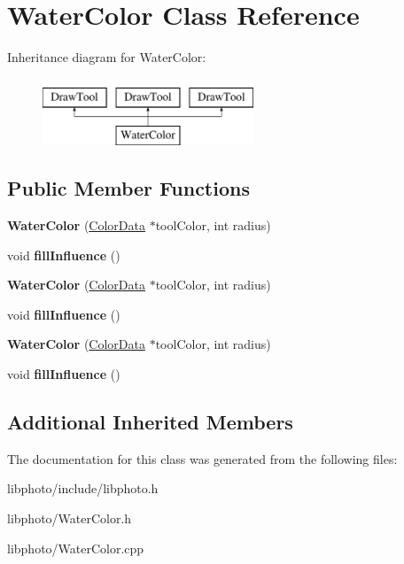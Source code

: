 \hypertarget{classWaterColor}{\section{Water\-Color Class Reference}
\label{classWaterColor}
}
Inheritance diagram for Water\-Color\-:\begin{figure}[H]
\begin{center}
\leavevmode
\includegraphics[height=2.000000cm]{classWaterColor}
\end{center}
\end{figure}
\subsection*{Public Member Functions}
\begin{DoxyCompactItemize}
\item 
\hypertarget{classWaterColor_ac61121474a9faeabc3610be7c6dd24b6}{{\bfseries Water\-Color} (\hyperlink{classColorData}{Color\-Data} $\ast$tool\-Color, int radius)}\label{classWaterColor_ac61121474a9faeabc3610be7c6dd24b6}

\item 
\hypertarget{classWaterColor_a98f3e467458f9a329c783d1c03af05db}{void {\bfseries fill\-Influence} ()}\label{classWaterColor_a98f3e467458f9a329c783d1c03af05db}

\item 
\hypertarget{classWaterColor_ac61121474a9faeabc3610be7c6dd24b6}{{\bfseries Water\-Color} (\hyperlink{classColorData}{Color\-Data} $\ast$tool\-Color, int radius)}\label{classWaterColor_ac61121474a9faeabc3610be7c6dd24b6}

\item 
\hypertarget{classWaterColor_a98f3e467458f9a329c783d1c03af05db}{void {\bfseries fill\-Influence} ()}\label{classWaterColor_a98f3e467458f9a329c783d1c03af05db}

\item 
\hypertarget{classWaterColor_ac61121474a9faeabc3610be7c6dd24b6}{{\bfseries Water\-Color} (\hyperlink{classColorData}{Color\-Data} $\ast$tool\-Color, int radius)}\label{classWaterColor_ac61121474a9faeabc3610be7c6dd24b6}

\item 
\hypertarget{classWaterColor_a98f3e467458f9a329c783d1c03af05db}{void {\bfseries fill\-Influence} ()}\label{classWaterColor_a98f3e467458f9a329c783d1c03af05db}

\end{DoxyCompactItemize}
\subsection*{Additional Inherited Members}


The documentation for this class was generated from the following files\-:\begin{DoxyCompactItemize}
\item 
libphoto/include/libphoto.\-h\item 
libphoto/Water\-Color.\-h\item 
libphoto/Water\-Color.\-cpp\end{DoxyCompactItemize}
